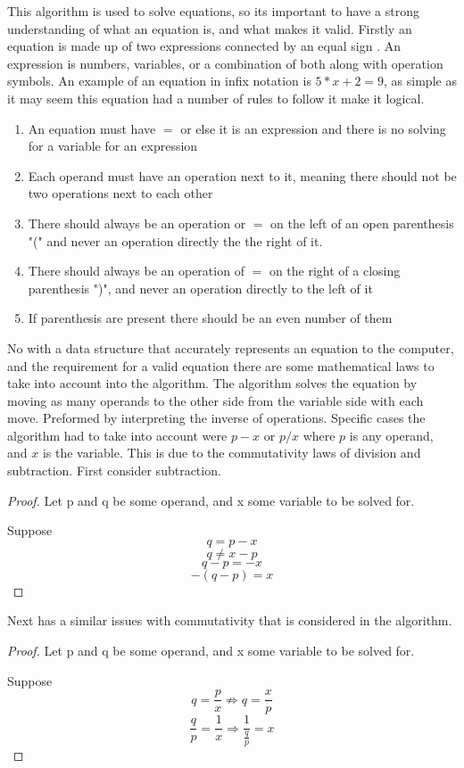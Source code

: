 \documentclass[10pt,twocolumn]{article}
\begin{document}
This algorithm is used to solve equations, so its important to have a strong understanding of what an equation is, and what makes it valid. Firstly an equation is made up of two expressions connected by an equal sign \cite{noauthor_algebra_nodate}. An expression is numbers, variables, or a combination of both along with operation symbols. An example of an equation in infix notation is $5*x + 2 = 9$, as simple as it may seem this equation had a number of rules to follow it make it logical. 
\begin{enumerate}
    \item An equation must have $=$ or else it is an expression and there is no solving for a variable for an expression
    \item Each operand must have an operation next to it, meaning there should not be two operations next to each other
    \item There should always be an operation or $=$ on the left of an open parenthesis "(" and never an operation directly the the right of it. 
    \item There should always be an operation of $=$ on the right of a closing parenthesis ")", and never an operation directly to the left of it
    \item If parenthesis are present there should be an even number of them
\end{enumerate}


No with a data structure that accurately represents an equation to the computer, and the requirement for a valid equation there are some mathematical laws to take into account into the algorithm. The algorithm solves the equation by moving as many operands to the other side from the variable side with each move. Preformed by interpreting the inverse of operations. Specific cases the algorithm had to take into account were $p-x$ or $p/x$ where $p$ is any operand, and $x$ is the variable. This is due to the commutativity laws of division and subtraction. First consider subtraction.
\begin{proof}
    
    Let p and q be some operand, and x some variable to be solved for. 
    
    Suppose  $$q = p-x$$
   $$q \neq x-p$$
    $$q-p = -x$$
    $$ -(q - p ) = x$$
\end{proof}
 Next has a similar issues with commutativity that is considered in the algorithm.  
\begin{proof}
    
    Let p and q be some operand, and x some variable to be solved for. 
    
    Suppose  $$q = \frac{p}{x} \not\Rightarrow q = \frac{x}{p} $$
    $$\frac{q}{p} = \frac{1}{x} \Rightarrow \frac{1}{\frac{q}{p}} = x$$

\end{proof}
\end{document}

